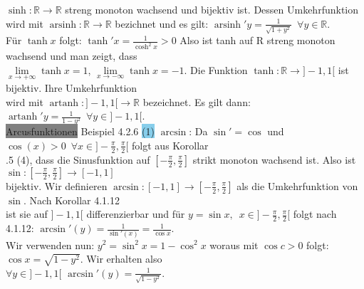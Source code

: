 \documentclass[10pt]{article}
\begin{document}
                $\sinh:\mathbb{R}\longrightarrow\mathbb{R}$ streng monoton
                wachsend und bijektiv ist. Dessen Umkehrfunktion \\
        \indent wird mit 
                $\operatorname{arsinh}:\mathbb{R}\longrightarrow\mathbb{R}$ 
                bezichnet und es gilt:
                $\operatorname{arsinh}'y
                =\frac{1}{\sqrt{1+y^2}}\enspace\forall y\in\mathbb{R}$. \\
        \indent Für $\tanh x$ folgt:
                $\tanh'x=\frac{1}{\cosh^2x}>0$ Also ist tanh auf R streng
                monoton wachsend und man zeigt, dass \\
        \indent $\lim\limits_{x\to+\infty}\tanh x=1$,
                $\lim\limits_{x\to-\infty}\tanh x=-1$.
                Die Funktion $\tanh:\mathbb{R}\longrightarrow]-1,1[$ ist
                bijektiv. Ihre Umkehrfunktion \\
        \indent wird mit 
                $\operatorname{artanh}:]-1,1[\longrightarrow\mathbb{R}$
                bezeichnet. Es gilt dann:
                $\operatorname{artanh}'y=\frac{1}{1-y^2}\enspace
                \forall y\in]-1,1[$. \\
\colorbox{gray}{Arcusfunktionen} Beispiel 4.2.6 
                \colorbox{SkyBlue}{(1)} $\arcsin$: Da $\sin'=\cos$ und 
                $\cos(x)>0\enspace\forall x\in]-\frac{\pi}{2},\frac{\pi}{2}[$
                folgt aus Korollar \\
        .5 (4), dass die Sinusfunktion
                auf $[-\frac{\pi}{2},\frac{\pi}{2}]$ strikt monoton wachsend
                ist. Also ist 
                $\sin:[-\frac{\pi}{2},\frac{\pi}{2}]\longrightarrow[-1,1]$ \\
        \indent bijektiv. Wir definieren
                $\arcsin:[-1,1]\longrightarrow[-\frac{\pi}{2},\frac{\pi}{2}]$
                als die Umkehrfunktion von $\sin$. Nach Korollar 4.1.12 \\
        \indent ist sie auf $]-1,1[$ differenzierbar und für
                $y=\sin x,\enspace x\in]-\frac{\pi}{2},\frac{\pi}{2}[$
                folgt nach 4.1.12:
                $\arcsin'(y)=\frac{1}{\sin'(x)}=\frac{1}{\cos x}$.\\
        \indent Wir verwenden nun: $y^2=\sin^2x=1-\cos^2x$
                woraus mit $\cos c>0$ folgt:
                $\cos x=\sqrt{1-y^2}$. Wir erhalten also \\
        \indent $\forall y\in ]-1,1[$
                $\arcsin'(y)=\frac{1}{\sqrt{1-y^2}}$.\\
\end{document}
